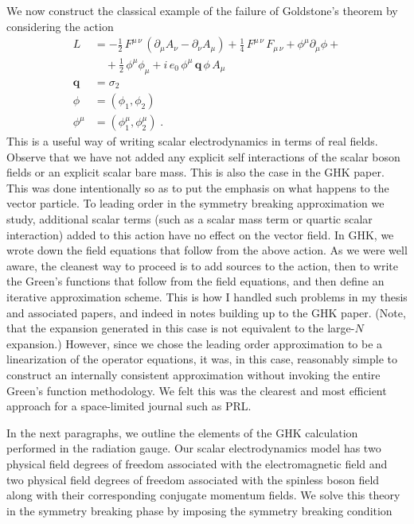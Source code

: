 \documentclass[12pt]{article}
\newcommand{\pa}{\partial}
\begin{document}
We now construct the classical example of the failure of Goldstone's theorem
by considering the action \begin{align*} L &= -\frac{1}{2}\, F^{\mu\, \nu}\,
  (\pa_{\mu}A_{\nu} - \pa_{\nu}A_{\mu}) + \frac{1}{4}\, F^{\mu\,
    \nu}\,F_{\mu\, \nu} + \phi^{\mu}\pa_{\mu}\phi + \\ &\quad+ \frac{1}{2}\,
  \phi^{\mu}\phi_{\mu} + i\,e_0\, \phi^{\mu}\, \mathbf{q}\, \phi\,
  A_{\mu} \\ \mathbf{q} &= \sigma_2 \\ \phi &= (\phi_1, \phi_2) \\
  \phi^{\mu} &= (\phi^{\mu}_{1}, \phi^{\mu}_{2}) \; .  \end{align*} This is a
useful way of writing scalar electrodynamics in terms of real fields.  Observe
that we have not added any explicit self interactions of the scalar boson
fields or an explicit scalar bare mass.  This is also the case in the GHK
paper. This was done intentionally so as to put the emphasis on what happens
to the vector particle. To leading order in the symmetry breaking
approximation we study, additional scalar terms (such as a scalar mass term or
quartic scalar interaction) added to this action have no effect on the vector
field. In GHK, we wrote down the field equations that follow from the above
action. As we were well aware, the cleanest way to proceed is to add sources
to the action, then to write the Green's functions that follow from the field
equations, and then define an iterative approximation scheme. This is how I
handled such problems in my thesis and associated papers, and indeed in notes
building up to the GHK paper. (Note, that the expansion generated in this case is
not equivalent to the large-$N$ expansion.) However, since we chose the
leading order approximation to be a linearization of the operator equations,
it was, in this case, reasonably simple to construct an internally consistent
approximation without invoking the entire Green's function methodology. We
felt this was the clearest and most efficient approach for a space-limited
journal such as PRL.

   In the next paragraphs, we outline the elements of the GHK
   calculation performed in the radiation gauge. Our scalar
   electrodynamics model has two physical field degrees of freedom
   associated with the electromagnetic field and two physical field
   degrees of freedom associated with the spinless boson field along
   with their corresponding conjugate momentum fields. We solve this
   theory in the symmetry breaking phase by imposing the symmetry
   breaking condition
\end{document}
